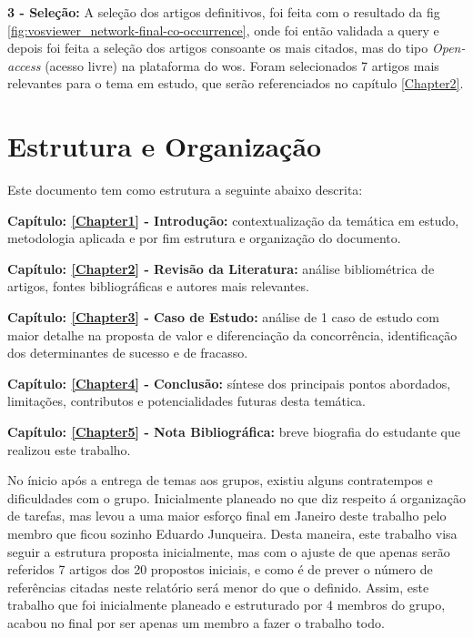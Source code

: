 {\setlength{\parindent}{0pt}
\textbf{ 3 - Seleção:}
}
A seleção dos artigos definitivos, foi feita com o resultado da \gls{fig} \ref{fig:vosviewer_network-final-co-occurrence}, onde foi então validada a \gls{query} e depois foi feita a seleção dos artigos consoante os mais citados, mas do tipo \textit{Open-access} (acesso livre) na plataforma do \gls{wos}.
Foram selecionados 7 artigos mais relevantes para o tema em estudo, que serão referenciados no capítulo \ref{Chapter2}.

\section{Estrutura e Organização}
\label{sec:estrutura_organizacao}

Este documento tem como estrutura a seguinte abaixo descrita:

{\setlength{\parindent}{0pt}

\textbf{ Capítulo: \ref{Chapter1} - Introdução:} contextualização da temática em estudo, metodologia aplicada e por fim estrutura e organização do documento.

\textbf{ Capítulo: \ref{Chapter2} - Revisão da Literatura:} análise bibliométrica de artigos, fontes bibliográficas e autores mais relevantes.

\textbf{ Capítulo: \ref{Chapter3} - Caso de Estudo:} análise de 1 caso de estudo com maior detalhe na proposta de valor e diferenciação da concorrência, identificação dos determinantes de sucesso e de fracasso.

\textbf{ Capítulo: \ref{Chapter4} - Conclusão:} síntese dos principais pontos abordados, limitações, contributos e potencialidades futuras desta temática.


\textbf{ Capítulo: \ref{Chapter5} - Nota Bibliográfica:} breve biografia do estudante que realizou este trabalho.
}
No ínicio após a entrega de temas aos grupos, existiu alguns contratempos e dificuldades com o grupo. Inicialmente planeado no que diz respeito á organização de tarefas, mas levou a uma maior esforço final em Janeiro deste trabalho pelo membro que ficou sozinho Eduardo Junqueira.
Desta maneira, este trabalho  visa seguir a estrutura proposta inicialmente, mas com o ajuste de que apenas serão referidos 7 artigos dos 20 propostos iniciais, e como é de prever o número de referências citadas neste relatório será menor do que o definido. 
Assim, este trabalho que foi inicialmente planeado e estruturado por 4 membros do grupo, acabou no final por ser apenas um membro a fazer o trabalho todo.
